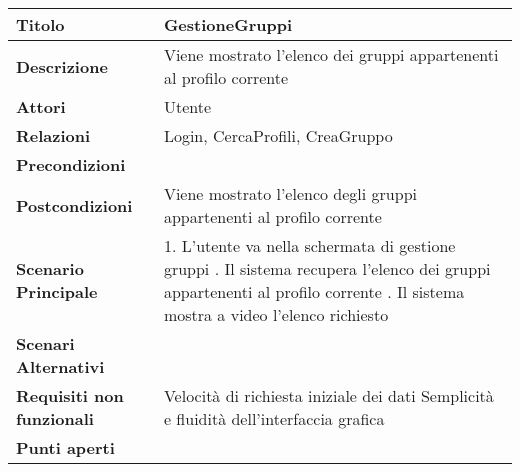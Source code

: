 \begin{tabular} {|P{4.5cm}|P{11cm}|}
  \hline
  \textbf{Titolo}                   & GestioneGruppi                                                        \\
  \hline
  \textbf{Descrizione}              & Viene mostrato l'elenco dei gruppi appartenenti al profilo corrente   \\
  \hline
  \textbf{Attori}                   & Utente                                                                \\
  \hline
  \textbf{Relazioni}                & Login, CercaProfili, CreaGruppo                                       \\
  \hline
  \textbf{Precondizioni}            &                                                                       \\
  \hline
  \textbf{Postcondizioni}           & Viene mostrato l'elenco degli gruppi appartenenti al profilo corrente \\
  \hline
  \textbf{Scenario Principale}      & 1. L'utente va nella schermata di gestione gruppi . Il sistema recupera l'elenco dei gruppi appartenenti al profilo corrente . Il sistema mostra a video l'elenco richiesto                                                           \\
  \hline
  \textbf{Scenari Alternativi}      &                                                                       \\
  \hline
  \textbf{Requisiti non funzionali} & Velocità di richiesta iniziale dei dati\linebreak
  Semplicità e fluidità dell'interfaccia grafica                                                            \\
  \hline
  \textbf{Punti aperti}             &                                                                       \\
  \hline
\end{tabular}
\hfill
\break

